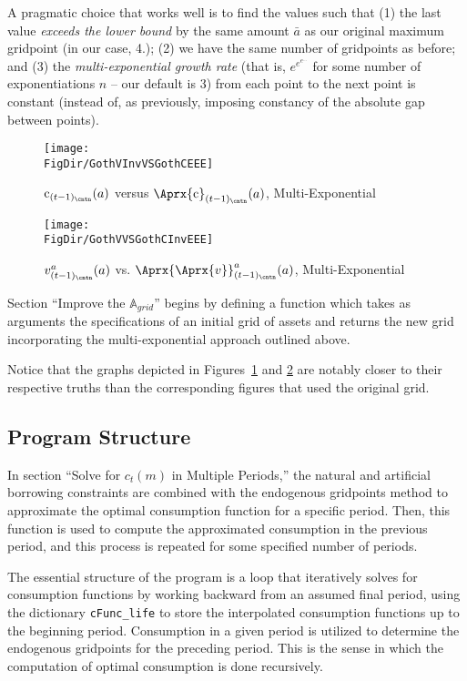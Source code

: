 \documentclass[titlepage, headings=optiontotocandhead]{Resources/texmf-local/tex/latex/econtex}
\begin{document}
A pragmatic choice that works well is to find the values such that (1) the last value \textit{exceeds the lower bound} by the same amount $\bar a$ as our original maximum gridpoint (in our case, 4.); (2) we have the same number of gridpoints as before; and (3) the \textit{multi-exponential growth rate} (that is, $e^{e^{e^{...}}}$ for some number of exponentiations $n$ -- our default is 3) from each point to the next point is constant (instead of, as previously, imposing constancy of the absolute gap between points).

\hypertarget{GothVInvVSGothCEEE}{}
\begin{figure}
  \centerline{\texttt{[image: \\FigDir/GothVInvVSGothCEEE]}}
  \caption{$\mathrm{c}_{(t-1)_\cntn}(a)$ versus
    $\Aprx{\mathrm{c}}_{(t-1)_\cntn}(a)$, Multi-Exponential }
  \label{fig:GothVInvVSGothCEE}
\end{figure}


\hypertarget{GothVVSGothCInvEEE}{}
\begin{figure}
  \texttt{[image: \\FigDir/GothVVSGothCInvEEE]}
  \caption{$v^{a}_{(t-1)_\cntn}(a)$ vs.
    $\Aprx{\Aprx{v}}_{(t-1)_\cntn}^{a}(a)$, Multi-Exponential }
  \label{fig:GothVVSGothCInvEE}
\end{figure}

Section ``Improve the $\mathbb{A}_{grid}$'' begins by defining a function which takes as arguments the specifications of an initial grid of assets and returns the new grid incorporating the multi-exponential approach outlined above.


Notice that the graphs depicted in Figures~\ref{fig:GothVInvVSGothCEE} and \ref{fig:GothVVSGothCInvEE} are notably closer to their respective truths than the corresponding figures that used the original grid.

\subsection{Program Structure}

In section ``Solve for $c_t(m)$ in Multiple Periods,'' the natural and artificial borrowing constraints are combined with the endogenous gridpoints method to approximate the optimal consumption function for a specific period. Then, this function is used to compute the approximated consumption in the previous period, and this process is repeated for some specified number of periods.

The essential structure of the program is a loop that iteratively solves for consumption functions by working backward from an assumed final period, using the dictionary \texttt{cFunc\_life} to store the interpolated consumption functions up to the beginning period. Consumption in a given period is utilized to determine the endogenous gridpoints for the preceding period. This is the sense in which the computation of optimal consumption is done recursively.
\end{document}
